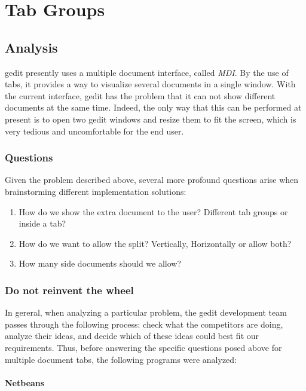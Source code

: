 \chapter{Tab Groups}

\section{Analysis}

gedit presently uses a multiple document interface, called \emph{MDI}. By the use of tabs, it provides a way to visualize several documents in a single window. With the current interface,  gedit has the problem that it can not show different documents at the same time.  Indeed,  the only way that this can be performed at present is to open two gedit windows and resize them to fit the screen, which is very tedious and uncomfortable for the end user.

\subsection{Questions}


Given the problem described above, several more profound questions arise when brainstorming different implementation solutions: 
\begin{enumerate}
  \item How do we show the extra document to the user? Different tab groups or inside a tab?
  \item How do we want to allow the split? Vertically, Horizontally or allow both?
  \item How many side documents should we allow?
\end{enumerate}

\subsection{Do not reinvent the wheel}

In gereral, when analyzing a particular problem, the gedit development team passes through the following process: 
check what the competitors are doing, analyze their ideas,  and decide which of these ideas could best fit our requirements. 
Thus, before answering the specific questions posed above for multiple document tabs, the following programs were analyzed:



\subsubsection{Netbeans}

